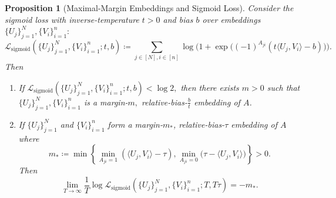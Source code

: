 \documentclass[preprint]{article}
\newtheorem{proposition}{Proposition}[]
\newcommand{\sigloss}{\mathcal{L}_{\text{sigmoid}}}
\begin{document}
\begin{proposition}[Maximal-Margin Embeddings and Sigmoid Loss]
\label{prop:marginsigmoid} 
Consider the sigmoid loss with inverse-temperature $t>0$ and bias $b$ over embeddings $\{U_j\}_{j = 1}^N, \{V_i\}_{i = 1}^n:$ 
$$
\sigloss(\{U_j\}_{j = 1}^N, \{V_i\}_{i = 1}^n; t, b)\coloneqq \sum_{j\in [N], i \in [n]} \log\Big(1 + \exp\big((-1)^{A_{ji}}(t\langle U_j, V_i\rangle -b)\big)\Big).
$$
Then
\begin{enumerate}
    \item If $\sigloss(\{U_j\}_{j = 1}^N, \{V_i\}_{i = 1}^n; t, b) < \log 2,$ then there exists $m > 0$ such that $\{U_j\}_{j = 1}^N, \{V_i\}_{i = 1}^n$ is a margin-$m,$ relative-bias-$\frac{b}{t}$ embedding of $A$.
    \item If $\{U_j\}_{j=1}^N$ and $\{V_i\}_{i=1}^n$ form a margin-$m_*$, relative-bias-$\tau$ embedding of $A$ where
$$
m_* \coloneqq \min\left\{
\min_{A_{ji}=1}\left(\langle U_j,V_i\rangle-\tau\right),
\min_{A_{ji}=0}\bigl(\tau-\langle U_j,V_i\rangle\bigr)
\right\} > 0.
$$
Then
$$
\lim_{T\to\infty}\frac{1}{T}\log \sigloss(\{U_j\}_{j=1}^N,\{V_i\}_{i=1}^n;T,T\tau)=-m_*.
$$
\end{enumerate}
\end{proposition}
\end{document}
